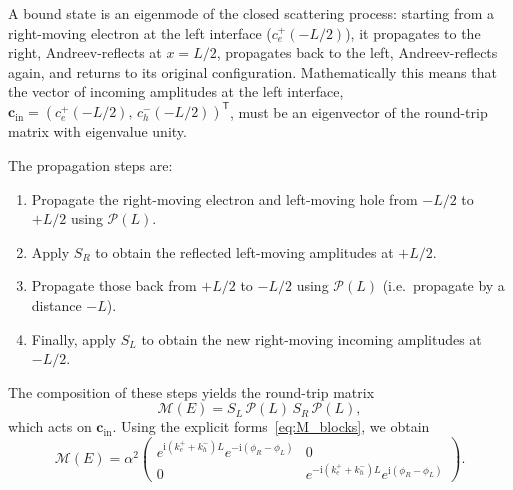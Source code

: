 \documentclass[11pt,a4paper,twoside,openany]{report}
\begin{document}
A bound state is an eigenmode of the closed scattering process: starting from a right-moving electron at the left interface ($c_e^+(-L/2)$), it propagates to the right, Andreev-reflects at $x=L/2$, propagates back to the left, Andreev-reflects again, and returns to its original configuration.  Mathematically this means that the vector of incoming amplitudes at the left interface,
$\mathbf{c}_{\mathrm{in}} = (c_e^+(-L/2),\, c_h^-(-L/2))^{\mathsf T}$, must be an eigenvector of the round-trip matrix with eigenvalue unity.

The propagation steps are:

\begin{enumerate}
  \item Propagate the right-moving electron and left-moving hole from $-L/2$ to $+L/2$ using $\mathcal{P}(L)$.
  \item Apply $S_R$ to obtain the reflected left-moving amplitudes at $+L/2$.
  \item Propagate those back from $+L/2$ to $-L/2$ using $\mathcal{P}(L)$ (i.e.\ propagate by a distance $-L$).
  \item Finally, apply $S_L$ to obtain the new right-moving incoming amplitudes at $-L/2$.
\end{enumerate}
The composition of these steps yields the round-trip matrix
\begin{equation}
  \mathcal{M}(E) = S_L \, \mathcal{P}(L) \, S_R \, \mathcal{P}(L),
  \label{eq:M_round}
\end{equation}
which acts on $\mathbf{c}_{\mathrm{in}}$.  Using the explicit forms~\eqref{eq:M_blocks}, we obtain
\begin{equation}
  \mathcal{M}(E) = \alpha^2 \begin{pmatrix}
    e^{\mathrm{i}(k_e^+ + k_h^-)L} e^{-\mathrm{i}(\phi_R - \phi_L)} & 0 \\[4pt]
    0 & e^{-\mathrm{i}(k_e^+ + k_h^-)L} e^{\mathrm{i}(\phi_R - \phi_L)}
  \end{pmatrix}.
  \label{eq:M_round_explicit}
\end{equation}
\end{document}
